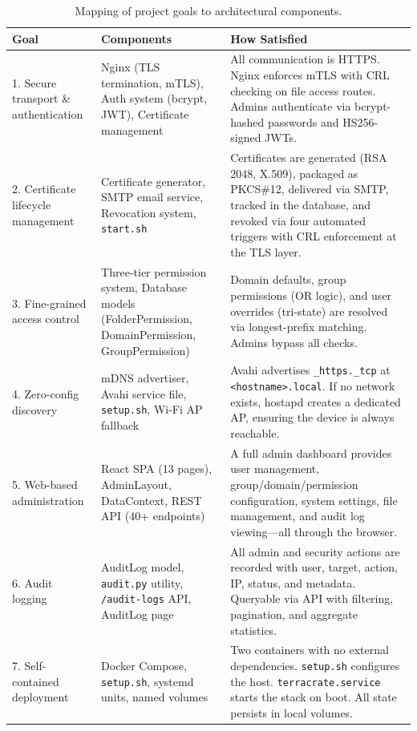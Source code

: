 \documentclass[12pt,letterpaper]{report}
\begin{document}
\begin{table}[ht]
\centering
\caption{Mapping of project goals to architectural components.}
\label{tab:req-satisfaction}
\small
\begin{tabular}{p{}p{}p{}}
\hline
\textbf{Goal} & \textbf{Components} & \textbf{How Satisfied} \\
\hline
1. Secure transport \& authentication &
Nginx (TLS termination, mTLS), Auth system (bcrypt, JWT), Certificate management &
All communication is HTTPS. Nginx enforces mTLS with CRL checking on file access routes. Admins authenticate via bcrypt-hashed passwords and HS256-signed JWTs. \\
\hline
2. Certificate lifecycle management &
Certificate generator, SMTP email service, Revocation system, \texttt{start.sh} &
Certificates are generated (RSA 2048, X.509), packaged as PKCS\#12, delivered via SMTP, tracked in the database, and revoked via four automated triggers with CRL enforcement at the TLS layer. \\
\hline
3. Fine-grained access control &
Three-tier permission system, Database models (FolderPermission, DomainPermission, GroupPermission) &
Domain defaults, group permissions (OR logic), and user overrides (tri-state) are resolved via longest-prefix matching. Admins bypass all checks. \\
\hline
4. Zero-config discovery &
mDNS advertiser, Avahi service file, \texttt{setup.sh}, Wi-Fi AP fallback &
Avahi advertises \texttt{\_https.\_tcp} at \texttt{<hostname>.local}. If no network exists, hostapd creates a dedicated AP, ensuring the device is always reachable. \\
\hline
5. Web-based administration &
React SPA (13 pages), AdminLayout, DataContext, REST API (40+ endpoints) &
A full admin dashboard provides user management, group/domain/permission configuration, system settings, file management, and audit log viewing---all through the browser. \\
\hline
6. Audit logging &
AuditLog model, \texttt{audit.py} utility, \texttt{/audit-logs} API, AuditLog page &
All admin and security actions are recorded with user, target, action, IP, status, and metadata. Queryable via API with filtering, pagination, and aggregate statistics. \\
\hline
7. Self-contained deployment &
Docker Compose, \texttt{setup.sh}, systemd units, named volumes &
Two containers with no external dependencies. \texttt{setup.sh} configures the host. \texttt{terracrate.service} starts the stack on boot. All state persists in local volumes. \\
\hline
\end{tabular}
\end{table}
\end{document}
